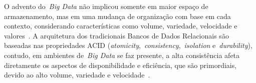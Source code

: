 \documentclass[12pt]{article}
\begin{document}

O advento do~\emph{Big Data} não implicou somente em maior espaço de armazenamento, mas em uma mudança de organização com base em cada contexto, considerando características como volume, variedade, velocidade e valores~\cite{ward2013undefined}. 
A arquitetura dos tradicionais Bancos de Dados Relacionais são baseadas nas propriedades ACID (\textit{atomicity},~\textit{consistency},~\textit{isolation} e~\textit{durability}), contudo, em ambientes de~\emph{Big Data} se faz presente, a alta consistência afeta diretamente os aspectos de disponibilidade e eficiência, que são primordiais, devido ao alto volume, variedade e velocidade~\cite{aparicio:2016}. 

\end{document}

